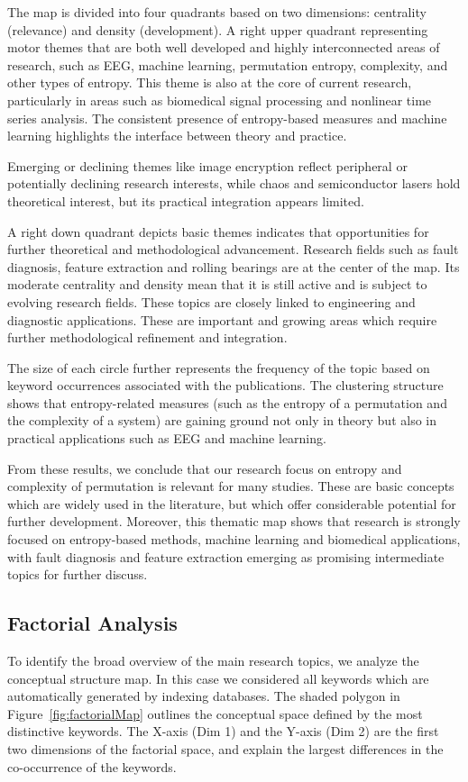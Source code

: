 The map is divided into four quadrants based on two dimensions: centrality (relevance) and density (development). 
A right upper quadrant representing motor themes that are both well developed and highly interconnected areas of research, such as EEG, machine learning, permutation entropy, complexity, and other types of entropy. This theme is also at the core of current research, particularly in areas such as biomedical signal processing and nonlinear time series analysis. The consistent presence of entropy-based measures and machine learning highlights the interface between theory and practice.

Emerging or declining themes like image encryption reflect peripheral or potentially declining research interests, while chaos and semiconductor lasers hold theoretical interest, but its practical integration appears limited.  

A right down quadrant depicts basic themes indicates that opportunities for further theoretical and methodological advancement. 
Research fields such as fault diagnosis, feature extraction and rolling bearings are at the center of the map. Its moderate centrality and density mean that it is still active and is subject to evolving research fields. These topics are closely linked to engineering and diagnostic applications. These are important and growing areas which require further methodological refinement and integration.

The size of each circle further represents the frequency of the topic based on keyword occurrences associated with the publications. The clustering structure shows that entropy-related measures (such as the entropy of a permutation and the complexity of a system) are gaining ground not only in theory but also in practical applications such as EEG and machine learning.

From these results, we conclude that our research focus on entropy and complexity of permutation is relevant for many studies. These are basic concepts which are widely used in the literature, but which offer considerable potential for further development. Moreover, this thematic map shows that research is strongly focused on entropy-based methods, machine learning and biomedical applications, with fault diagnosis and feature extraction emerging as promising intermediate topics for further discuss.

\subsection{Factorial Analysis}
To identify the broad overview of the main research topics, we analyze the conceptual structure map. In this case we considered all keywords which are automatically generated by indexing databases. The shaded polygon in Figure~\ref{fig:factorialMap}  outlines the conceptual space defined by the most distinctive keywords. The X-axis (Dim 1) and the Y-axis (Dim 2) are the first two dimensions of the factorial space, and explain the largest differences in the co-occurrence of the keywords.

